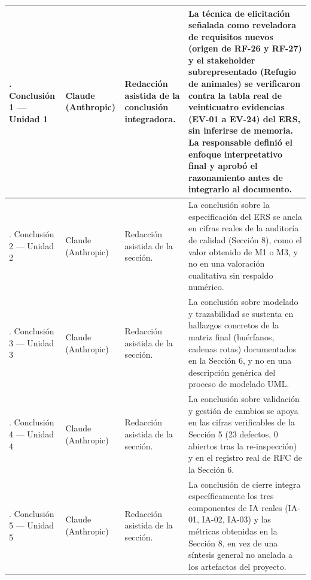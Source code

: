 \documentclass[journal,onecolumn]{IEEEtran}
\begin{document}
\begin{longtable}{
	|>{\raggedright\arraybackslash}p{3.2cm}
	|>{\raggedright\arraybackslash}p{1.8cm}
	|>{\raggedright\arraybackslash}p{4.3cm}
	|>{\raggedright\arraybackslash}p{5cm}|}
	\hline
	10. Conclusión 1 --- Unidad 1 &
	Claude (Anthropic) &
	Redacción asistida de la conclusión integradora. &
	La técnica de elicitación señalada como reveladora de requisitos
	nuevos (origen de RF-26 y RF-27) y el stakeholder subrepresentado
	(Refugio de animales) se verificaron contra la tabla real de
	veinticuatro evidencias (EV-01 a EV-24) del ERS, sin inferirse de
	memoria. La responsable definió el enfoque interpretativo final y
	aprobó el razonamiento antes de integrarlo al documento. \\
	\hline
	10. Conclusión 2 --- Unidad 2 &
	Claude (Anthropic) &
	Redacción asistida de la sección. &
	La conclusión sobre la especificación del ERS se ancla en cifras
	reales de la auditoría de calidad (Sección 8), como el valor
	obtenido de M1 o M3, y no en una valoración cualitativa sin
	respaldo numérico. \\
	\hline
	10. Conclusión 3 --- Unidad 3 &
	Claude (Anthropic) &
	Redacción asistida de la sección. &
	La conclusión sobre modelado y trazabilidad se sustenta en
	hallazgos concretos de la matriz final (huérfanos, cadenas rotas)
	documentados en la Sección 6, y no en una descripción genérica del
	proceso de modelado UML. \\
	\hline
	10. Conclusión 4 --- Unidad 4 &
	Claude (Anthropic) &
	Redacción asistida de la sección. &
	La conclusión sobre validación y gestión de cambios se apoya en
	las cifras verificables de la Sección 5 (23 defectos, 0 abiertos
	tras la re-inspección) y en el registro real de RFC de la Sección
	6. \\
	\hline
	10. Conclusión 5 --- Unidad 5 &
	Claude (Anthropic) &
	Redacción asistida de la sección. &
	La conclusión de cierre integra específicamente los tres
	componentes de IA reales (IA-01, IA-02, IA-03) y las métricas
	obtenidas en la Sección 8, en vez de una síntesis general no
	anclada a los artefactos del proyecto. \\
	\hline
\end{longtable}
\normalsize
\end{document}
